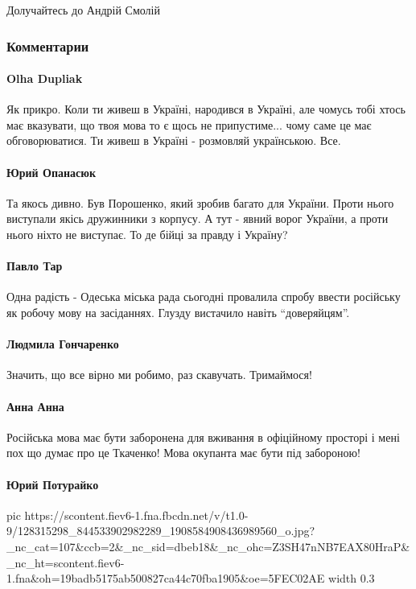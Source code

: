 Долучайтесь до Андрій Смолій

\subsubsection{Комментарии}

\paragraph{Olha Dupliak}

Як прикро. Коли ти живеш в Україні, народився в Україні, але чомусь тобі хтось
має вказувати, що твоя мова то є щось не припустиме... чому саме це має
обговорюватися. Ти живеш в Україні - розмовляй українською. Все.

\paragraph{Юрий Опанасюк}

Та якось дивно.  Був Порошенко, який зробив багато для України. Проти нього
виступали якісь дружинники з корпусу.  А тут - явний ворог України, а проти
нього ніхто не виступає.  То де бійці за правду і Україну?

\paragraph{Павло Тар}

Одна радість - Одеська міська рада сьогодні провалила спробу ввести російську
як робочу мову на засіданнях. Глузду вистачило навіть \enquote{доверяйцям}.

\paragraph{Людмила Гончаренко}

Значить, що все вірно ми робимо, раз скавучать. Тримаймося!

\paragraph{Анна Анна}

Російська мова має бути заборонена для вживання в офіційному просторі і мені
пох що думає про це Ткаченко! Мова окупанта має бути під забороною!

\paragraph{Юрий Потурайко}

\ifcmt
pic https://scontent.fiev6-1.fna.fbcdn.net/v/t1.0-9/128315298_844533902982289_1908584908436989560_o.jpg?_nc_cat=107&ccb=2&_nc_sid=dbeb18&_nc_ohc=Z3SH47nNB7EAX80HraP&_nc_ht=scontent.fiev6-1.fna&oh=19badb5175ab500827ca44c70fba1905&oe=5FEC02AE
width 0.3
\fi

